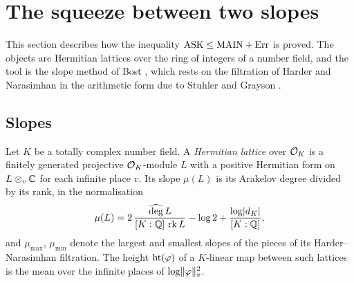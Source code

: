 \section{The squeeze between two slopes}\label{sec:lattices}

This section describes how the inequality $\mathrm{ASK}\le\mathrm{MAIN}+\mathrm{Err}$ is proved. The objects are
Hermitian lattices over the ring of integers of a number field, and the tool is the slope
method of Bost \cite{bost1996,bost2001}, which rests on the filtration of Harder and
Narasimhan \cite{harder1975} in the arithmetic form due to Stuhler and Grayson
\cite{stuhler1976,grayson1984}.

\subsection{Slopes}
Let $K$ be a totally complex number field. A \emph{Hermitian lattice} over $\mathcal{O}_K$ is a finitely
generated projective $\mathcal{O}_K$-module $L$ with a positive Hermitian form on $L\otimes_v\mathbb{C}$ for
each infinite place $v$. Its slope $\mu(L)$ is its Arakelov degree divided by its rank, in the
normalisation \lvS
\[
\mu(L)=2\,\frac{\widehat{\deg}\,L}{[K:\mathbb{Q}]\,\operatorname{rk} L}-\log 2+\frac{\log\lvert d_K\rvert}{[K:\mathbb{Q}]},
\]
and $\mu_{\max}$, $\mu_{\min}$ denote the largest and smallest slopes of the pieces of its
Harder--Narasimhan filtration. The height $\operatorname{ht}(\varphi)$ of a $K$-linear map between such
lattices is the mean over the infinite places of $\log\lVert \varphi\rVert_v^2$.

